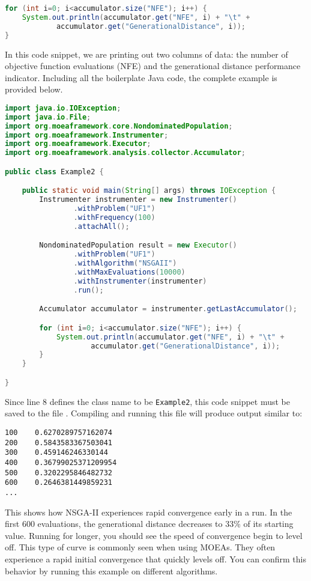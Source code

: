 \begin{lstlisting}[language=Java]
for (int i=0; i<accumulator.size("NFE"); i++) {
	System.out.println(accumulator.get("NFE", i) + "\t" +  
			accumulator.get("GenerationalDistance", i));
}
\end{lstlisting}

In this code snippet, we are printing out two columns of data: the number of objective function evaluations (NFE) and the generational distance performance indicator.  Including all the boilerplate Java code, the complete example is provided below.

\begin{lstlisting}[language=Java]
import java.io.IOException;
import java.io.File;
import org.moeaframework.core.NondominatedPopulation;
import org.moeaframework.Instrumenter;
import org.moeaframework.Executor;
import org.moeaframework.analysis.collector.Accumulator;

public class Example2 {

	public static void main(String[] args) throws IOException {
		Instrumenter instrumenter = new Instrumenter()
				.withProblem("UF1")
				.withFrequency(100)
				.attachAll();

		NondominatedPopulation result = new Executor()
				.withProblem("UF1")
				.withAlgorithm("NSGAII")
				.withMaxEvaluations(10000)
				.withInstrumenter(instrumenter)
				.run();

		Accumulator accumulator = instrumenter.getLastAccumulator();

		for (int i=0; i<accumulator.size("NFE"); i++) {
			System.out.println(accumulator.get("NFE", i) + "\t" +  
					accumulator.get("GenerationalDistance", i));
		}
	}

}
\end{lstlisting}

Since line 8 defines the class name to be \texttt{Example2}, this code snippet must be saved to the file .  Compiling and running this file will produce output similar to:

\begin{lstlisting}[language=Plaintext]
100    0.6270289757162074
200    0.5843583367503041
300    0.459146246330144
400    0.36799025371209954
500    0.3202295846482732
600    0.2646381449859231
...
\end{lstlisting}

This shows how NSGA-II experiences rapid convergence early in a run.  In the first 600 evaluations, the generational distance decreases to 33\% of its starting value.  Running for longer, you should see the speed of convergence begin to level off.  This type of curve is commonly seen when using MOEAs.  They often experience a rapid initial convergence that quickly levels off.  You can confirm this behavior by running this example on different algorithms.

